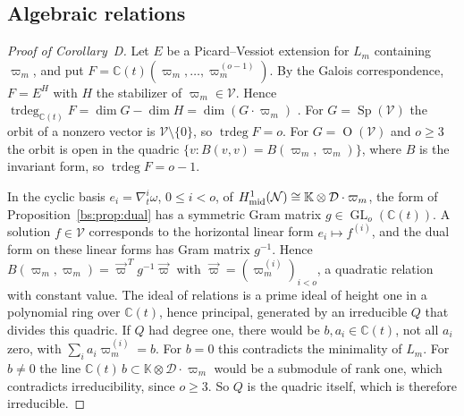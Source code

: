 \documentclass[11pt,a4paper]{article}
\theoremstyle{definition}
\theoremstyle{remark}
\numberwithin{equation}{section}
\newcommand{\C}{\mathbb{C}}
\newcommand{\Kt}{\mathbb{K}}
\newcommand{\cD}{\mathcal{D}}
\newcommand{\cN}{\mathcal{N}}
\DeclareMathOperator{\GL}{GL}
\DeclareMathOperator{\Ort}{O}
\DeclareMathOperator{\Sp}{Sp}
\DeclareMathOperator{\trdeg}{trdeg}
\begin{document}
\subsection{Algebraic relations}
\begin{proof}[Proof of Corollary~D]
Let $E$ be a Picard--Vessiot extension for $L_m$ containing $\varpi_m$, and put $F=\C(t)(\varpi_m,\dots,\varpi_m^{(o-1)})$. By the Galois correspondence, $F=E^H$ with $H$ the stabilizer of $\varpi_m\in\mathcal V$. Hence $\trdeg_{\C(t)}F=\dim G-\dim H=\dim(G\cdot\varpi_m)$ \cite{vdPS03}. For $G=\Sp(\mathcal V)$ the orbit of a nonzero vector is $\mathcal V\setminus\{0\}$, so $\trdeg F=o$. For $G=\Ort(\mathcal V)$ and $o\ge3$ the orbit is open in the quadric $\{v:B(v,v)=B(\varpi_m,\varpi_m)\}$, where $B$ is the invariant form, so $\trdeg F=o-1$.

In the cyclic basis $e_i=\nabla_t^i\omega$, $0\le i<o$, of $H^1_{\rm mid}(\cN)\cong\Kt\otimes\cD\cdot\varpi_m$, the form of Proposition~\ref{bs:prop:dual} has a symmetric Gram matrix $g\in\GL_o(\C(t))$. A solution $f\in\mathcal V$ corresponds to the horizontal linear form $e_i\mapsto f^{(i)}$, and the dual form on these linear forms has Gram matrix $g^{-1}$. Hence $B(\varpi_m,\varpi_m)=\vec\varpi^{\,T}g^{-1}\vec\varpi$ with $\vec\varpi=(\varpi_m^{(i)})_{i<o}$, a quadratic relation with constant value. The ideal of relations is a prime ideal of height one in a polynomial ring over $\C(t)$, hence principal, generated by an irreducible $Q$ that divides this quadric. If $Q$ had degree one, there would be $b,a_i\in\C(t)$, not all $a_i$ zero, with $\sum_ia_i\varpi_m^{(i)}=b$. For $b=0$ this contradicts the minimality of $L_m$. For $b\ne0$ the line $\C(t)\,b\subset\Kt\otimes\cD\cdot\varpi_m$ would be a submodule of rank one, which contradicts irreducibility, since $o\ge3$. So $Q$ is the quadric itself, which is therefore irreducible.
\end{proof}
\end{document}

